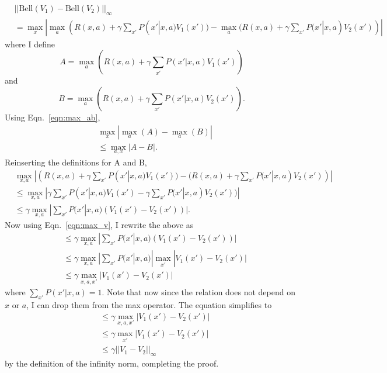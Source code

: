 \documentclass[12pt]{amsart}
\begin{document}
\begin{equation}
\begin{split}
& ||\text{Bell}(V_1) - \text{Bell}(V_2)||_{\infty} \\
& = \max_{x} | \max_a (R(x,a) + \gamma \sum_{x'}P(x'|x,a)V_1(x')) - \max_a (R(x,a) + \gamma \sum_{x'}P(x'|x,a)V_2(x'))|
\end{split}
\end{equation}
where I define 
\begin{equation}
A = \max_a (R(x,a) + \gamma \sum_{x'}P(x'|x,a)V_1(x'))
\end{equation}
and 
\begin{equation}
B = \max_a (R(x,a) + \gamma \sum_{x'}P(x'|x,a)V_2(x')).
\end{equation}
Using Eqn.~\ref{eqn:max_ab},
\begin{equation}
\begin{split}
& \max_x | \max_a(A) - \max_a(B) | \\
& \leq \max_{a,x} |A - B|.
\end{split}
\end{equation}
Reinserting the definitions for A and B,
\begin{equation}
\begin{split}
&\max_{x,a} |(R(x,a) + \gamma \sum_{x'}P(x'|x,a)V_1(x')) - (R(x,a) + \gamma \sum_{x'}P(x'|x,a)V_2(x'))| \\
&\leq \max_{x,a} | \gamma \sum_{x'}P(x'|x,a)V_1(x') - \gamma \sum_{x'}P(x'|x,a)V_2(x'))| \\
& \leq  \gamma \max_{x,a} |\sum_{x'}P(x'|x,a)(V_1(x') - V_2(x'))|.
\end{split}
\end{equation}
Now using Eqn.~\ref{eqn:max_v}, I rewrite the above as
\begin{equation}
\begin{split}
& \leq  \gamma \max_{x,a} |\sum_{x'}P(x'|x,a)(V_1(x') - V_2(x'))| \\
& \leq \gamma \max_{x,a} |\sum_{x'}P(x'|x,a)| \max_{x'}|V_1(x') - V_2(x')| \\
& \leq \gamma \max_{x,a,x'}|V_1(x') - V_2(x')|
\end{split}
\end{equation}
where $\sum_{x'}P(x'|x,a) = 1$.  Note that now since the relation does not depend on $x$ or $a$, I can drop them from the max operator.  The equation simplifies to 
\begin{equation}
\begin{split}
& \leq \gamma \max_{x,a,x'}|V_1(x') - V_2(x')| \\
& \leq \gamma \max_{x'}|V_1(x') - V_2(x')| \\
& \leq \gamma ||V_1 - V_2||_{\infty}
\end{split}
\end{equation}
by the definition of the infinity norm, completing the proof.
\end{document}
